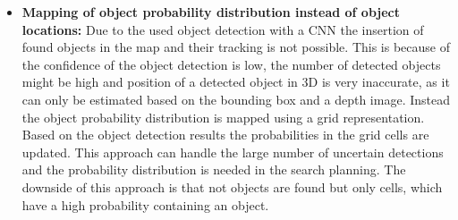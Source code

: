 \begin{itemize}
 \item \textbf{Mapping of object probability distribution instead of object locations:} \newline
 Due to the used object detection with a CNN the insertion of found objects in the map and their tracking is not possible. This is because of the confidence of the object detection is low, the number of detected objects might be high and position of a detected object in 3D is very inaccurate, as it can only be estimated based on the bounding box and a depth image. Instead the object probability distribution is mapped using a grid representation. Based on the object detection results the probabilities in the grid cells are updated. This approach can handle the large number of uncertain detections and the probability distribution is needed in the search planning. The downside of this approach is that not objects are found but only cells, which have a high probability containing an object.
 
\end{itemize}
